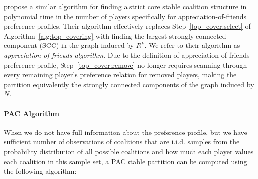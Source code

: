  propose a similar algorithm for finding a strict core
stable coalition structure in polynomial time in the number of players
specifically for appreciation-of-friends preference profiles.
Their algorithm effectively replaces Step~\ref{top_cover:select} of
Algorithm~\ref{alg:top_covering} with finding the largest strongly connected
component (SCC) in the graph induced by $R^k$.
We refer to their algorithm as \textit{appreciation-of-friends algorithm}.
Due to the definition of appreciation-of-friends preference profile,
Step~\ref{top_cover:remove} no longer requires scanning through every remaining
player's preference relation for removed players, making the partition
equivalently the strongly connected components of the graph induced by $N$.


\paragraph{PAC Algorithm}
\label{para:pac_algo}

When we do not have full information about the preference profile, but we have
sufficient number of observations of coalitions that are i.i.d. samples from
the probability distribution of all possible coalitions and how much each player
values each coalition in this sample set, a PAC stable partition can be computed
using the following algorithm:

